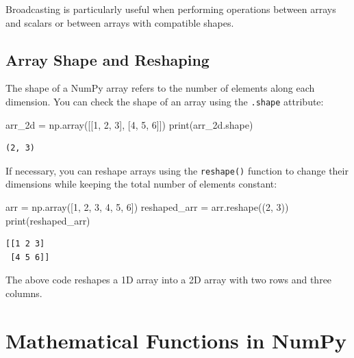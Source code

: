 \documentclass[
  letterpaper,
  DIV=11,
  numbers=noendperiod]{scrreprt}
\newenvironment{Shaded}{\begin{snugshade}}{\end{snugshade}}
\newcommand{\BuiltInTok}[1]{\textcolor[rgb]{0.00,0.23,0.31}{#1}}
\newcommand{\DecValTok}[1]{\textcolor[rgb]{0.68,0.00,0.00}{#1}}
\newcommand{\NormalTok}[1]{\textcolor[rgb]{0.00,0.23,0.31}{#1}}
\newcommand{\OperatorTok}[1]{\textcolor[rgb]{0.37,0.37,0.37}{#1}}
\begin{document}
Broadcasting is particularly useful when performing operations between
arrays and scalars or between arrays with compatible shapes.

\hypertarget{array-shape-and-reshaping}{%
\subsection{Array Shape and Reshaping}\label{array-shape-and-reshaping}}

The shape of a NumPy array refers to the number of elements along each
dimension. You can check the shape of an array using the \texttt{.shape}
attribute:

\begin{Shaded}
\begin{Highlighting}[]
\NormalTok{arr\_2d }\OperatorTok{=}\NormalTok{ np.array([[}\DecValTok{1}\NormalTok{, }\DecValTok{2}\NormalTok{, }\DecValTok{3}\NormalTok{], [}\DecValTok{4}\NormalTok{, }\DecValTok{5}\NormalTok{, }\DecValTok{6}\NormalTok{]])}
\BuiltInTok{print}\NormalTok{(arr\_2d.shape) }
\end{Highlighting}
\end{Shaded}

\begin{verbatim}
(2, 3)
\end{verbatim}

If necessary, you can reshape arrays using the \texttt{reshape()}
function to change their dimensions while keeping the total number of
elements constant:

\begin{Shaded}
\begin{Highlighting}[]
\NormalTok{arr }\OperatorTok{=}\NormalTok{ np.array([}\DecValTok{1}\NormalTok{, }\DecValTok{2}\NormalTok{, }\DecValTok{3}\NormalTok{, }\DecValTok{4}\NormalTok{, }\DecValTok{5}\NormalTok{, }\DecValTok{6}\NormalTok{])}
\NormalTok{reshaped\_arr }\OperatorTok{=}\NormalTok{ arr.reshape((}\DecValTok{2}\NormalTok{, }\DecValTok{3}\NormalTok{))}
\BuiltInTok{print}\NormalTok{(reshaped\_arr)}
\end{Highlighting}
\end{Shaded}

\begin{verbatim}
[[1 2 3]
 [4 5 6]]
\end{verbatim}

The above code reshapes a 1D array into a 2D array with two rows and
three columns.

\hypertarget{mathematical-functions-in-numpy}{%
\section{Mathematical Functions in
NumPy}\label{mathematical-functions-in-numpy}}
\end{document}
